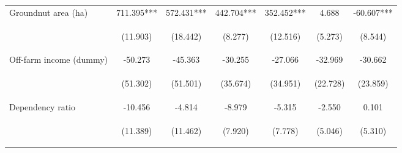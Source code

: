 \begin{center}
\begin{tabular}{lcccccc}
Groundnut area (ha) & 711.395*** & 572.431*** & 442.704*** & 352.452*** & 4.688 & -60.607*** \\
\vspace{4pt} & \begin{footnotesize}(11.903)\end{footnotesize} & \begin{footnotesize}(18.442)\end{footnotesize} & \begin{footnotesize}(8.277)\end{footnotesize} & \begin{footnotesize}(12.516)\end{footnotesize} & \begin{footnotesize}(5.273)\end{footnotesize} & \begin{footnotesize}(8.544)\end{footnotesize} \\
Off-farm income (dummy) & -50.273 & -45.363 & -30.255 & -27.066 & -32.969 & -30.662 \\
\vspace{4pt} & \begin{footnotesize}(51.302)\end{footnotesize} & \begin{footnotesize}(51.501)\end{footnotesize} & \begin{footnotesize}(35.674)\end{footnotesize} & \begin{footnotesize}(34.951)\end{footnotesize} & \begin{footnotesize}(22.728)\end{footnotesize} & \begin{footnotesize}(23.859)\end{footnotesize} \\
Dependency ratio & -10.456 & -4.814 & -8.979 & -5.315 & -2.550 & 0.101 \\
\vspace{4pt} & \begin{footnotesize}(11.389)\end{footnotesize} & \begin{footnotesize}(11.462)\end{footnotesize} & \begin{footnotesize}(7.920)\end{footnotesize} & \begin{footnotesize}(7.778)\end{footnotesize} & \begin{footnotesize}(5.046)\end{footnotesize} & \begin{footnotesize}(5.310)\end{footnotesize} \\

\end{tabular}
\end{center}
